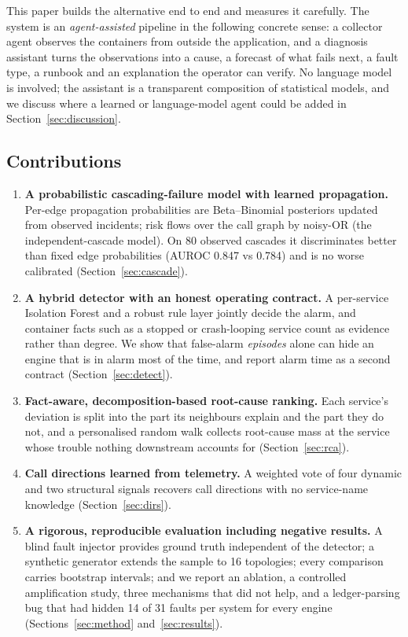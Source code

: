 \documentclass[journal]{IEEEtran}
\begin{document}
This paper builds the alternative end to end and measures it carefully. The system is an \emph{agent-assisted} pipeline in
the following concrete sense: a collector agent observes the containers from outside the application, and a diagnosis
assistant turns the observations into a cause, a forecast of what fails next, a fault type, a runbook and an explanation the
operator can verify. No language model is involved; the assistant is a transparent composition of statistical models, and we
discuss where a learned or language-model agent could be added in Section~\ref{sec:discussion}.

\subsection{Contributions}
\begin{enumerate}
\item \textbf{A probabilistic cascading-failure model with learned propagation.} Per-edge propagation probabilities are
Beta--Binomial posteriors updated from observed incidents; risk flows over the call graph by noisy-OR (the independent-cascade
model). On 80 observed cascades it discriminates better than fixed edge probabilities (AUROC 0.847 vs 0.784) and is no worse
calibrated (Section~\ref{sec:cascade}).
\item \textbf{A hybrid detector with an honest operating contract.} A per-service Isolation Forest and a robust rule layer jointly
decide the alarm, and container facts such as a stopped or crash-looping service count as evidence rather than degree. We show
that false-alarm \emph{episodes} alone can hide an engine that is in alarm most of the time, and report alarm time as a
second contract (Section~\ref{sec:detect}).
\item \textbf{Fact-aware, decomposition-based root-cause ranking.} Each service's deviation is split into the part its
neighbours explain and the part they do not, and a personalised random walk collects root-cause mass at the service whose trouble
nothing downstream accounts for (Section~\ref{sec:rca}).
\item \textbf{Call directions learned from telemetry.} A weighted vote of four dynamic and two structural signals recovers call directions
with no service-name knowledge (Section~\ref{sec:dirs}).
\item \textbf{A rigorous, reproducible evaluation including negative results.} A blind fault injector provides ground truth
independent of the detector; a synthetic generator extends the sample to 16 topologies; every comparison carries bootstrap
intervals; and we report an ablation, a controlled amplification study, three mechanisms that did
not help, and a ledger-parsing bug that had hidden 14 of 31 faults per system for every engine
(Sections~\ref{sec:method} and~\ref{sec:results}).
\end{enumerate}
\end{document}
